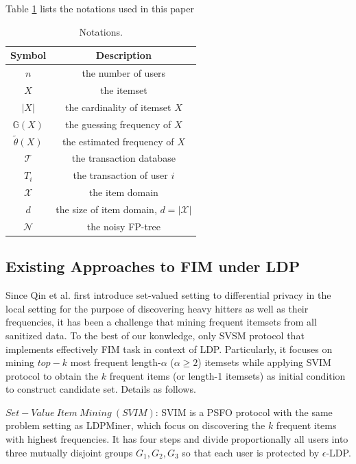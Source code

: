 \documentclass[conference]{IEEEtran}
\begin{document}
{\color{red}Table \ref{notations} lists the notations used in this paper}

\begin{table}[!t]
\caption{Notations.}
\begin{center}
\begin{tabular}{|c|c|}\hline
  Symbol&Description \\\hline
  $n$ & the number of users \\\hline
  $X$ & the itemset \\\hline
  $|X|$ & the cardinality of itemset $X$ \\\hline
  $\mathbb{G}(X)$ & the guessing frequency of $X$ \\\hline
  $\tilde{\theta}(X)$ & the estimated frequency of $X$ \\\hline
  $\mathcal{T}$ & the transaction database \\\hline
  $T_i$ & the transaction of user $i$ \\\hline
  $\mathcal{X}$ & the item domain \\\hline
  $d$ & the size of item domain, $d = |\mathcal{X}|$ \\\hline
  $\mathcal{N}$ & the noisy FP-tree \\\hline

\end{tabular}
\label{notations}
\end{center}
\end{table}

\subsection{Existing Approaches to FIM under LDP}\label{svim and svsm}
Since Qin et al.\cite{a1} first introduce set-valued setting to differential privacy in the local setting for the purpose of discovering heavy hitters as well as their frequencies, it has been a challenge that mining frequent itemsets from all sanitized data. To the best of our konwledge, only SVSM\cite{a2} protocol that implements effectively FIM task in context of LDP. Particularly, it focuses on mining $top-k$ most frequent length-$\alpha$ ($\alpha\geq2$) itemsets while applying SVIM\cite{a2} protocol to obtain the $k$ frequent items (or length-1 itemsets) as initial condition to construct candidate set. Details as follows. 

$Set-Value\ Item\ Mining\ (SVIM)$: SVIM is a PSFO protocol with the same problem setting as LDPMiner\cite{a1}, which focus on discovering the $k$ frequent items with highest frequencies. It has four steps and divide proportionally all users into three mutually disjoint groups $G_1,G_2,G_3$ so that each user is protected by $\epsilon$-LDP.
\end{document}
